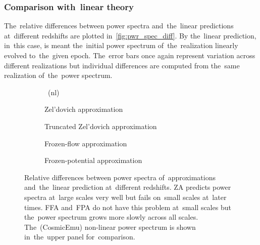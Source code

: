 \subsubsection{Comparison with~linear theory}
The~relative differences between power spectra and~the~linear predictions at~different redshifts are plotted in~\autoref{fig:pwr_spec_diff}. By the~linear prediction, in~this case, is meant the~initial power spectrum of~the~realization linearly evolved to~the~given epoch. The~error bars once again represent variation across different realizations but individual differences are computed from the~same realization of~the~power spectrum.
\begin{figure*}[!hbt]
	\begin{adjustwidth}{-1cm}{-1cm}
	\centering
		\begin{subfigure}{1.0\linewidth}
		\end{subfigure}
		\begin{subfigure}{0.5\linewidth}
			\caption{\LCDM\ (nl)}	
		\end{subfigure}
		\begin{subfigure}{0.5\linewidth}
			\caption{Zel'dovich approximation}
		\end{subfigure}%
		\begin{subfigure}{0.5\linewidth}
			\caption{Truncated Zel'dovich approximation}
		\end{subfigure}
		\begin{subfigure}{0.5\linewidth}
			\caption{Frozen-flow approximation}
		\end{subfigure}%
		\begin{subfigure}{0.5\linewidth}
			\caption{Frozen-potential approximation}
		\end{subfigure}
	\end{adjustwidth}
	\caption{Relative differences between power spectra of~approximations and~the~linear prediction at~different redshifts. ZA predicts power spectra at~large scales very well but fails on~small scales at~later times. FFA and~FPA do not have this problem at~small scales but the~power spectrum grows more slowly across all scales. The~(CosmicEmu) non-linear power spectrum is shown in~the~upper panel for~comparison.}
	\label{fig:pwr_spec_diff}
\end{figure*}

